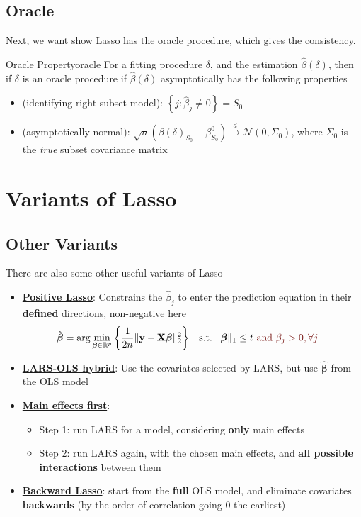 \documentclass[twoside]{article}
\begin{document}
\subsection{Oracle}
Next, we want show Lasso has the oracle procedure, which gives the consistency.
\begin{definition}{Oracle Property}{oracle}
    For a fitting procedure $\delta$, and the estimation $\hat{\beta}(\delta)$, then if $\delta$ is an oracle procedure if $\hat{\beta}(\delta)$ asymptotically has the following properties 
    \begin{itemize}
        \item {} (identifying right subset model): $\left\{ j:\hat{\beta}_j \neq 0 \right\} = S_0$
        \item {} (asymptotically normal): $\sqrt{n}\left( \beta(\delta)_{S_0} - \beta^0_{S_0} \right) \xrightarrow{d} \mathcal{N}(0,\Sigma_0)$, where $\Sigma_0$ is the \textit{true} subset covariance matrix
    \end{itemize}
\end{definition}



\section{Variants of Lasso}

\subsection{Other Variants}
There are also some other useful variants of Lasso
\begin{itemize}
    \item \textbf{\underline{Positive Lasso}}: Constrains the $\hat{\beta}_j$ to enter the prediction equation in their \textbf{defined} directions, non-negative here 
    \begin{align*}
        \hat{\boldsymbol{\beta}} &= \arg\min_{\boldsymbol{\beta}\in \mathbb{R}^p}\left\{ \frac{1}{2n} \lVert \mathbf{y}-\mathbf{X}\boldsymbol{\beta} \rVert^2_2 \right\} & \text{s.t.\ } & \lVert \boldsymbol{\beta} \rVert _1 \leq t \textcolor{myred}{\text{ and } \beta_j>0, \forall j}
    \end{align*}
    \item \textbf{\underline{LARS-OLS hybrid}}: Use the covariates selected by LARS, but use $\hat{\boldsymbol{\beta}}$ from the OLS model 
    \item \textbf{\underline{Main effects first}}:
    \begin{itemize}
        \item Step 1: run LARS for a model, considering \textbf{only} main effects 
        \item Step 2: run LARS again, with the chosen main effects, and \textbf{all possible interactions} between them
    \end{itemize}
    \item \textbf{\underline{Backward Lasso}}: start from the \textbf{full} OLS model, and eliminate covariates \textbf{backwards} (by the order of correlation going 0 the earliest)
\end{itemize}
\end{document}
